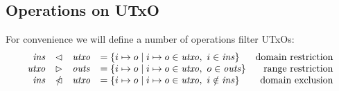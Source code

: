 \documentclass{article}
\newcommand{\restrictdom}{\lhd}
\newcommand{\subtractdom}{\mathbin{\slashed{\restrictdom}}}
\newcommand{\restrictrange}{\rhd}
\begin{document}
\subsection{Operations on UTxO}

For convenience we will define a number of operations filter UTxOs:
%
\begin{equation*}
\begin{array}{rcllr}
  \mathit{ins}
& \restrictdom
& \mathit{utxo}
& = \{ i \mapsto o \mid i \mapsto o \in \mathit{utxo}, ~ i \in \mathit{ins} \}
& \text{domain restriction}
\\
  \mathit{utxo}
& \restrictrange
& \mathit{outs}
& = \{ i \mapsto o \mid i \mapsto o \in \mathit{utxo}, ~ o \in \mathit{outs} \}
& \text{range restriction}
\\
  \mathit{ins}
& \subtractdom
& \mathit{utxo}
& = \{ i \mapsto o \mid i \mapsto o \in \mathit{utxo}, ~ i \notin \mathit{ins} \}
& \text{domain exclusion}
\end{array}
\end{equation*}
\end{document}
